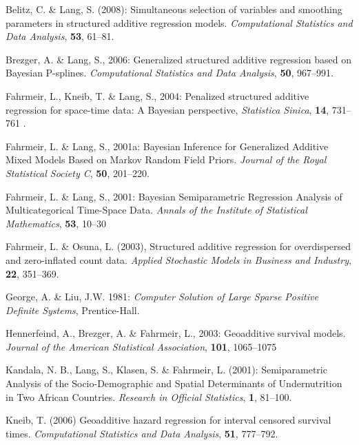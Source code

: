 \documentclass[11pt,a4paper,twoside]{bayesxreport}
\begin{document}
\begin{thebibliography}{99}

 Belitz, C. \& Lang, S.  (2008): Simultaneous selection of variables and smoothing
parameters in structured additive regression models. {\it Computational Statistics and Data Analysis}, {\bf 53}, 61--81.

 Brezger, A. \& Lang, S., 2006: Generalized structured additive regression based
on Bayesian P-splines. {\it Computational Statistics and Data Analysis}, {\bf 50}, 967--991.

 Fahrmeir, L., Kneib, T. \& Lang, S., 2004: Penalized structured additive
regression for space-time data: A Bayesian perspective, {\it Statistica Sinica}, {\bf 14}, 731--761 .

 Fahrmeir, L. \& Lang, S., 2001a: Bayesian Inference for Generalized Additive
Mixed Models Based on Markov Random Field Priors. {\it Journal of the Royal Statistical Society C}, {\bf 50}, 201--220.

 Fahrmeir, L. \& Lang, S., 2001: Bayesian Semiparametric Regression Analysis of
Multicategorical Time-Space Data. {\it Annals of the Institute of Statistical Mathematics}, {\bf 53}, 10--30

 Fahrmeir, L. \& Osuna, L. (2003), Structured additive regression for
overdispersed and zero-inflated count data. {\it Applied Stochastic Models in Business and Industry}, {\bf 22}, 351--369.

 George, A. \& Liu, J.W. 1981: {\it Computer Solution of Large Sparse Positive
Definite Systems}, Prentice-Hall.

 Hennerfeind, A., Brezger, A. \& Fahrmeir, L., 2003: Geoadditive
survival models. {\it Journal of the American Statistical Association}, {\bf 101}, 1065--1075

 Kandala, N. B., Lang, S., Klasen, S. \& Fahrmeir, L. (2001): Semiparametric
Analysis of the Socio-Demographic and Spatial Determinants of Undernutrition in Two African Countries. {\it Research in
Official Statistics}, {\bf 1}, 81--100.

  {Kneib, T.} (2006) Geoadditive hazard regression for interval censored
 survival times. {\it Computational Statistics and Data Analysis}, {\bf 51}, 777--792.


\end{thebibliography}
\end{document}
